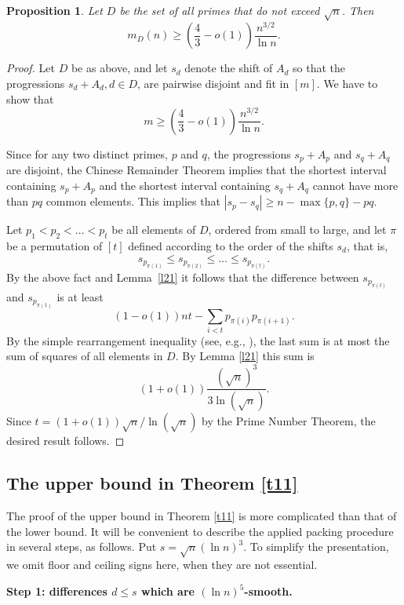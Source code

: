 \documentclass[12pt]{amsart}
\theoremstyle{plain}
\newtheorem{proposition}{Proposition}
\numberwithin{equation}{section}
\begin{document}
\begin{proposition}
	\label{p24}
	Let $D$ be the set of all primes that do not exceed $\sqrt n$.
	Then 
	$$m_D(n) \geqslant \left(\frac{4}{3}-o(1)\right)\frac{n^{3/2}}{\ln n}.$$
\end{proposition}
\begin{proof}
	Let $D$ be as above, and let $s_d$ denote the shift of $A_d$ so that the progressions $s_d+A_d, d \in D$, are pairwise disjoint and fit in $[m]$. We have to show that 
	$$
	m \geqslant \left(\frac{4}{3}-o(1)\right)\frac{n^{3/2}}{\ln n}.
	$$
	
	Since for any  two distinct primes, $p$ and $q$, the progressions $s_p+A_p$ and $s_q+A_q$ are disjoint,
	the Chinese Remainder Theorem implies that 
	the shortest  interval
	containing $s_p+A_p$ and the shortest interval containing $s_q+A_q$ cannot have more than $pq$ common elements. This implies that $|s_p-s_q| \geqslant n-\max\{p,q\}-pq$.
	
	Let $p_1<p_2< \ldots <p_t$ be all elements of $D$, ordered from small to large, and let $\pi$ be
	a permutation of $[t]$ defined according to the order of the shifts $s_d$, that is,
	$$s_{p_{\pi(1)}} \leqslant s_{p_{\pi(2)}} \leqslant \ldots \leqslant 
	s_{p_{\pi(t)}}.$$
	By the above fact and Lemma~\ref{l21} it follows that the difference between $s_{p_{\pi(t)}}$ and $s_{p_{\pi(1)}}$
	is at least $$(1-o(1)) nt -\sum_{i <t} p_{\pi(i)} p_{\pi(i+1)}.$$
	By the simple 	rearrangement inequality (see, e.g., \cite{HLP}), the last sum is at most the sum of squares of all elements in $D$.
	 By Lemma \ref{l21} this sum is 
	$$(1+o(1)) \frac{(\sqrt n)^3}{3 \ln (\sqrt n)}.$$ 
	Since $t=(1+o(1)) \sqrt n/ \ln (\sqrt n)$ by the Prime Number Theorem, the desired result follows.
\end{proof}

\subsection{The upper bound in Theorem \ref{t11}}

The proof of the upper bound in Theorem \ref{t11} is more complicated 
than that of the lower bound.
It will be convenient to describe the applied packing procedure 
in several steps, as follows. Put $s= \sqrt n (\ln n)^3$. To simplify the presentation, we omit 
floor and ceiling signs here, when they are not essential.

\vspace{0.2cm}

\noindent
{\bf Step 1: differences $d \leqslant s$ which are $(\ln n)^5$-smooth.}
\vspace{0.1cm}
\end{document}
